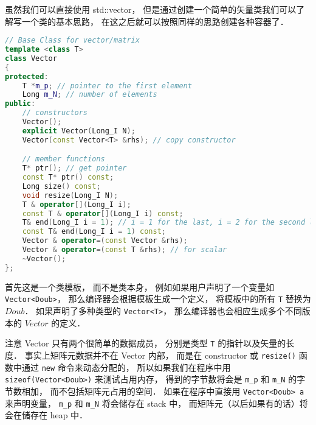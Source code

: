 
虽然我们可以直接使用 std::vector， 但是通过创建一个简单的矢量类我们可以了解写一个类的基本思路， 在这之后就可以按照同样的思路创建各种容器了．

\begin{lstlisting}[language=cpp]
// Base Class for vector/matrix
template <class T>
class Vector
{
protected:
	T *m_p; // pointer to the first element
	Long m_N; // number of elements
public:
	// constructors
	Vector();
	explicit Vector(Long_I N);
	Vector(const Vector<T> &rhs); // copy constructor

	// member functions
	T* ptr(); // get pointer
	const T* ptr() const;
	Long size() const;
	void resize(Long_I N);
	T & operator[](Long_I i);
	const T & operator[](Long_I i) const;
	T& end(Long_I i = 1); // i = 1 for the last, i = 2 for the second last...
	const T& end(Long_I i = 1) const;
	Vector & operator=(const Vector &rhs);
	Vector & operator=(const T &rhs); // for scalar
	~Vector();
};
\end{lstlisting}

首先这是一个类模板， 而不是类本身， 例如如果用户声明了一个变量如\lstinline|Vector<Doub>|， 那么编译器会根据模板生成一个定义， 将模板中的所有 \lstinline|T| 替换为 $Doub$． 如果声明了多种类型的 \lstinline|Vector<T>|， 那么编译器也会相应生成多个不同版本的 $Vector$ 的定义．

注意 Vector 只有两个很简单的数据成员， 分别是类型 \lstinline|T| 的指针以及矢量的长度． 事实上矩阵元数据并不在 Vector 内部， 而是在 constructor 或 \lstinline|resize()| 函数中通过 \lstinline|new| 命令来动态分配的， 所以如果我们在程序中用 \lstinline|sizeof(Vector<Doub>)| 来测试占用内存， 得到的字节数将会是 \lstinline|m_p| 和 \lstinline|m_N| 的字节数相加， 而不包括矩阵元占用的空间． 如果在程序中直接用 \lstinline|Vector<Doub> a| 来声明变量， \lstinline|m_p| 和 \lstinline|m_N| 将会储存在 stack 中， 而矩阵元（以后如果有的话）将会在储存在 heap 中．
